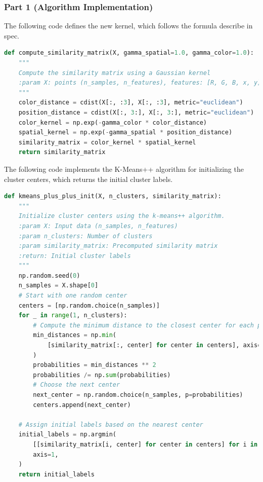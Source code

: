 \documentclass{homework}
\begin{document}
\subsubsection{Part 1 (Algorithm Implementation)}

The following code defines the new kernel, which follows the formula describe in spec.

\begin{lstlisting}[language=Python]
def compute_similarity_matrix(X, gamma_spatial=1.0, gamma_color=1.0):
    """
    Compute the similarity matrix using a Gaussian kernel
    :param X: points (n_samples, n_features), features: [R, G, B, x, y]
    """
    color_distance = cdist(X[:, :3], X[:, :3], metric="euclidean")
    position_distance = cdist(X[:, 3:], X[:, 3:], metric="euclidean")
    color_kernel = np.exp(-gamma_color * color_distance)
    spatial_kernel = np.exp(-gamma_spatial * position_distance)
    similarity_matrix = color_kernel * spatial_kernel
    return similarity_matrix
\end{lstlisting}

The following code implements the K-Means++ algorithm for initializing the cluster centers, which returns the initial cluster labels.

\begin{lstlisting}[language=Python]
def kmeans_plus_plus_init(X, n_clusters, similarity_matrix):
    """
    Initialize cluster centers using the k-means++ algorithm.
    :param X: Input data (n_samples, n_features)
    :param n_clusters: Number of clusters
    :param similarity_matrix: Precomputed similarity matrix
    :return: Initial cluster labels
    """
    np.random.seed(0)
    n_samples = X.shape[0]
    # Start with one random center
    centers = [np.random.choice(n_samples)]
    for _ in range(1, n_clusters):
        # Compute the minimum distance to the closest center for each point
        min_distances = np.min(
            [similarity_matrix[:, center] for center in centers], axis=0
        )
        probabilities = min_distances ** 2
        probabilities /= np.sum(probabilities)
        # Choose the next center
        next_center = np.random.choice(n_samples, p=probabilities)
        centers.append(next_center)

    # Assign initial labels based on the nearest center
    initial_labels = np.argmin(
        [[similarity_matrix[i, center] for center in centers] for i in range(n_samples)],
        axis=1,
    )
    return initial_labels
\end{lstlisting}
\end{document}

